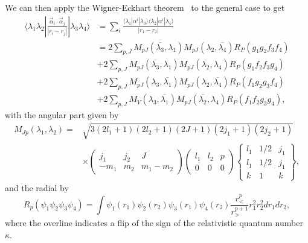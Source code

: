 We can then apply the Wigner-Eckhart theorem~\cite{sakurai2020modern} to the general case to get
\begin{align}
\langle \lambda_1 \lambda_2 | \frac{\vec{\alpha}_i \cdot \vec{\alpha}_j}{|r_i-r_j|} | \lambda_3 \lambda_4 \rangle &= \sum_i\frac{\langle \lambda_1 | \alpha^i | \lambda_3 \rangle \langle \lambda_2 | \alpha^i | \lambda_4 \rangle}{|r_1-r_2|} \nonumber
\\
&= 2\sum_{p,J} M_{pJ}(\overline{\lambda_3},\lambda_1)M_{pJ}(\lambda_2,\overline{\lambda_4})R_P(g_1 g_2 f_3 f_4) \nonumber
\\
&+2\sum_{p,J} M_{pJ}(\overline{\lambda_3},\lambda_1)M_{pJ}(\overline{\lambda_2},\lambda_4)R_P(g_1 f_2 f_3 g_4) \nonumber
\\
&+2\sum_{p,J} M_{pJ}(\lambda_3,\overline{\lambda_1})M_{pJ}(\lambda_2,\overline{\lambda_4})R_P(f_1 g_2 g_3 f_4) \nonumber
\\
&+2\sum_{p,J} M_{V}(\lambda_3,\overline{\lambda_1})M_{pJ}(\overline{\lambda_2},\lambda_4)R_P(f_1 f_2 g_3 g_4), \label{BreitFull}
\end{align}
with the angular part given by~\cite{PhysRev.154.17}
\begin{align}
M_{Jp}(\lambda_1,\lambda_2) = &\sqrt{3(2l_1+1)(2l_2+1)(2J+1)(2j_1+1)(2j_2+1)} \\
&\times\begin{pmatrix}
j_1 & j_2 & J
\\
-m_1 & m_2 & m_1-m_2
\end{pmatrix}\begin{pmatrix}
l_1 & l_2 & p
\\
0 & 0 & 0
\end{pmatrix}
\left\{\begin{matrix}
l_1 & 1/2 & j_1
\\
l_1 & 1/2 & j_1
\\
k & 1 & k
\end{matrix}\right\},
\end{align}
and the radial by
\begin{equation}
R_p(\psi_1 \psi_2 \psi_3 \psi_4) = \int \psi_1 (r_1) \psi_2 (r_2) \psi_3 (r_1) \psi_4 (r_2) \frac{r_<^p}{r_>^{p+1}}r_1^2r_2^2dr_1 dr_2,
\end{equation}
where the overline indicates a flip of the sign of the relativistic quantum number~$\kappa$.

